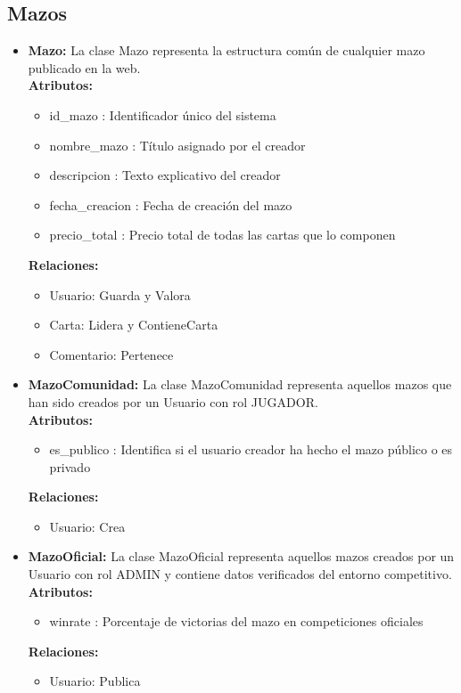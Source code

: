 \documentclass[10pt]{article}
\begin{document}
        \subsection{Mazos}
        \begin{itemize}
            \item \textbf{Mazo:} La clase Mazo representa la estructura común de cualquier mazo publicado en la web.\\
            \textbf{Atributos:}
            \begin{itemize}
                \item id\_mazo : Identificador único del sistema
                \item nombre\_mazo : Título asignado por el creador
                \item descripcion : Texto explicativo del creador
                \item fecha\_creacion : Fecha de creación del mazo
                \item precio\_total : Precio total de todas las cartas que lo componen
            \end{itemize}
            \textbf{Relaciones:}
            \begin{itemize}
                \item Usuario: Guarda y Valora
                \item Carta: Lidera y ContieneCarta
                \item Comentario: Pertenece
            \end{itemize}
            
            \item \textbf{MazoComunidad:} La clase MazoComunidad representa aquellos mazos que han sido creados por un Usuario con rol JUGADOR.\\
            \textbf{Atributos:}
            \begin{itemize}
                \item es\_publico : Identifica si el usuario creador ha hecho el mazo público o es privado
            \end{itemize}
            \textbf{Relaciones:}
            \begin{itemize}
                \item Usuario: Crea
            \end{itemize}
            
            \item \textbf{MazoOficial:} La clase MazoOficial representa aquellos mazos creados por un Usuario con rol ADMIN y contiene datos verificados del entorno competitivo.\\
            \textbf{Atributos:}
            \begin{itemize}
                \item winrate : Porcentaje de victorias del mazo en competiciones oficiales
            \end{itemize}
            \textbf{Relaciones:}
            \begin{itemize}
                \item Usuario: Publica
            \end{itemize}
            

\end{itemize}
\end{document}

